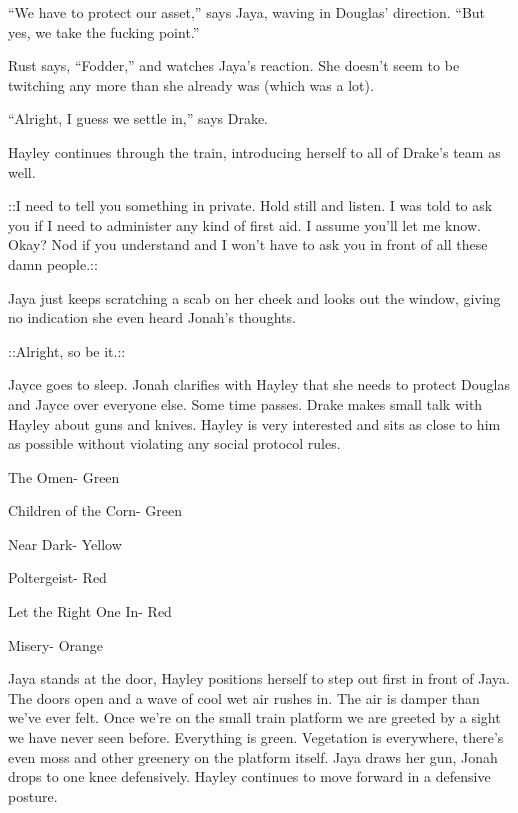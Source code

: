 ``We have to protect our asset,'' says Jaya, waving in Douglas' direction.  ``But yes, we take the fucking point.''

Rust says, ``Fodder,'' and watches Jaya's reaction.  She doesn't seem to be twitching any more than she already was (which was a lot).

``Alright, I guess we settle in,'' says Drake.

Hayley continues through the train, introducing herself to all of Drake's team as well.  

 {\color[RGB]{74,134,232}::I need to tell you something in private.  Hold still and listen.  I was told to ask you if I need to administer any kind of first aid.  I assume you'll let me know.  Okay?  Nod if you understand and I won't have to ask you in front of all these damn people.::} 

Jaya just keeps scratching a scab on her cheek and looks out the window, giving no indication she even heard Jonah's thoughts.  

 {\color[RGB]{74,134,232}::Alright, so be it.::   } 

Jayce goes to sleep.  Jonah clarifies with Hayley that she needs to protect Douglas and Jayce over everyone else.  Some time passes.  Drake makes small talk with Hayley about guns and knives.  Hayley is very interested and sits as close to him as possible without violating any social protocol rules.






The Omen- Green

Children of the Corn- Green

Near Dark- Yellow

Poltergeist- Red

Let the Right One In- Red

Misery- Orange



Jaya stands at the door, Hayley positions herself to step out first in front of Jaya.  The doors open and a wave of cool wet air rushes in.  The air is damper than we've ever felt.  Once we're on the small train platform we are greeted by a sight we have never seen before.  Everything is green.  Vegetation is everywhere, there's even moss and other greenery on the platform itself.  Jaya draws her gun, Jonah drops to one knee defensively.  Hayley continues to move forward in a defensive posture.



